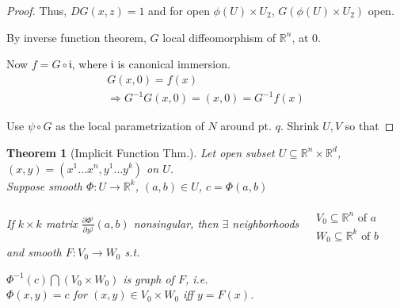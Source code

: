 \documentclass[10pt]{amsart}
\newtheorem{theorem}{Theorem}
\begin{document}
\begin{multicols*}{2}
\begin{proof}
Thus, $DG(x,z) =1$ and for open $\phi(U) \times U_2$, $ G(\phi(U)\times U_2)$ open.  

By inverse function theorem, $G$ local diffeomorphism of $\mathbb{R}^n$, at $0$.  

Now $f = G\circ \mathfrak{i}$, where $\mathfrak{i}$ is canonical immersion.  
\[
\begin{gathered}
  G(x,0) = f(x) \\
  \Longrightarrow G^{-1}G(x,0) = (x,0) = G^{-1}f(x)
\end{gathered}
\]

Use $\psi \circ G$ as the local parametrization of $N$ around pt. $q$.  Shrink $U,V$ so that 


\end{proof}






\begin{theorem}[Implicit Function Thm.]
  Let open subset $U\subseteq \mathbb{R}^n \times \mathbb{R}^d$, $(x,y) = (x^1 \dots x^n, y^1 \dots y^k) $ on $U$.  \\
  Suppose smooth $\Phi:U\to \mathbb{R}^k$, $(a,b) \in U$, $c=\Phi(a,b)$

  If $k\times k$ matrix $\frac{ \partial \Phi^i}{ \partial y^j}(a,b)$ nonsingular, then $\exists $ neighborhoods $\begin{aligned} & \quad \\
    & V_0 \subseteq \mathbb{R}^n \text{ of $a$ } \\
    & W_0 \subseteq \mathbb{R}^k \text{ of $b$ } \end{aligned}$ and smooth $F:V_0 \to W_0$ s.t.

  $\Phi^{-1}(c) \bigcap (V_0\times W_0)$ is graph of $F$, i.e. \\
  $\Phi(x,y) =c$ for $(x,y) \in V_0\times W_0$ iff $y=F(x)$.  
  \end{theorem}




\end{multicols*}
\end{document}
